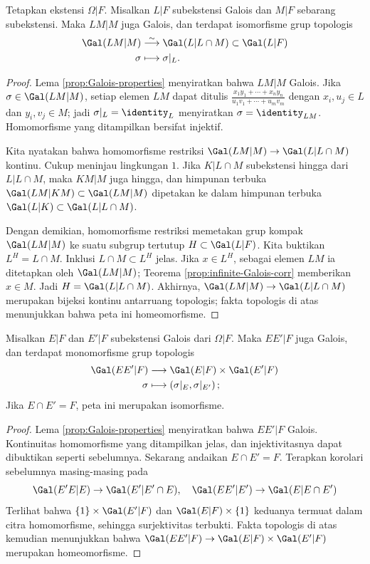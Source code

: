 \begin{corollary}\label{prop:Galois-group-basechange}
	Tetapkan ekstensi $\Omega|F$. Misalkan $L|F$ subekstensi Galois dan $M|F$ sebarang subekstensi. Maka $LM|M$ juga Galois, dan terdapat isomorfisme grup topologis
	\begin{align*}
		\Gal(LM|M) & \stackrel{\sim}{\longrightarrow} \Gal(L|L \cap M) \subset \Gal(L|F) \\
		\sigma & \longmapsto \sigma|_L.
	\end{align*}
\end{corollary}
\begin{proof}
	Lema \ref{prop:Galois-properties} menyiratkan bahwa $LM|M$ Galois. Jika $\sigma\in\Gal(LM|M)$, setiap elemen $LM$ dapat ditulis $\frac{x_1y_1+\cdots+x_ny_n}{u_1v_1+\cdots+u_mv_m}$ dengan $x_i,u_j\in L$ dan $y_i,v_j\in M$; jadi $\sigma|_L=\identity_L$ menyiratkan $\sigma=\identity_{LM}$. Homomorfisme yang ditampilkan bersifat injektif.

	Kita nyatakan bahwa homomorfisme restriksi $\Gal(LM|M)\to\Gal(L|L\cap M)$ kontinu. Cukup meninjau lingkungan $1$. Jika $K|L\cap M$ subekstensi hingga dari $L|L\cap M$, maka $KM|M$ juga hingga, dan himpunan terbuka $\Gal(LM|KM)\subset\Gal(LM|M)$ dipetakan ke dalam himpunan terbuka $\Gal(L|K)\subset\Gal(L|L\cap M)$.

	Dengan demikian, homomorfisme restriksi memetakan grup kompak $\Gal(LM|M)$ ke suatu subgrup tertutup $H\subset\Gal(L|F)$. Kita buktikan $L^H=L\cap M$. Inklusi $L\cap M\subset L^H$ jelas. Jika $x\in L^H$, sebagai elemen $LM$ ia ditetapkan oleh $\Gal(LM|M)$; Teorema \ref{prop:infinite-Galois-corr} memberikan $x\in M$. Jadi $H=\Gal(L|L\cap M)$. Akhirnya, $\Gal(LM|M)\to\Gal(L|L\cap M)$ merupakan bijeksi kontinu antarruang topologis; fakta topologis di atas menunjukkan bahwa peta ini homeomorfisme.
\end{proof}

\begin{corollary}\label{prop:Galois-group-compositum}
	Misalkan $E|F$ dan $E'|F$ subekstensi Galois dari $\Omega|F$. Maka $EE'|F$ juga Galois, dan terdapat monomorfisme grup topologis
	\begin{align*}
		\Gal(EE'|F) & \longrightarrow \Gal(E|F) \times \Gal(E'|F) \\
		\sigma & \longmapsto \left( \sigma|_E, \sigma|_{E'} \right);
	\end{align*}
	Jika $E\cap E'=F$, peta ini merupakan isomorfisme.
\end{corollary}
\begin{proof}
	Lema \ref{prop:Galois-properties} menyiratkan bahwa $EE'|F$ Galois. Kontinuitas homomorfisme yang ditampilkan jelas, dan injektivitasnya dapat dibuktikan seperti sebelumnya. Sekarang andaikan $E\cap E'=F$. Terapkan korolari sebelumnya masing-masing pada
	\[ \Gal(E'E|E) \to \Gal(E'| E' \cap E), \quad \Gal(EE'|E') \to \Gal(E | E \cap E') \]
	Terlihat bahwa $\{1\}\times\Gal(E'|F)$ dan $\Gal(E|F)\times\{1\}$ keduanya termuat dalam citra homomorfisme, sehingga surjektivitas terbukti. Fakta topologis di atas kemudian menunjukkan bahwa $\Gal(EE'|F)\to\Gal(E|F)\times\Gal(E'|F)$ merupakan homeomorfisme.
\end{proof}

